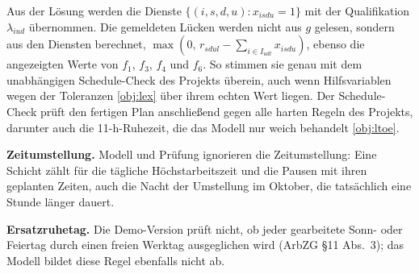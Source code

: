 \documentclass[11pt]{combiArticle}
\begin{document}
Aus der Lösung werden die Dienste $\{(i,s,d,u) : x_{isdu} = 1\}$ mit der Qualifikation $\lambda_{iud}$
übernommen. Die gemeldeten Lücken werden nicht aus $g$ gelesen, sondern aus den Diensten berechnet,
$\max(0,\, r_{sdul} - \sum_{i \in I_{udl}} x_{isdu})$, ebenso die angezeigten Werte von $f_1$, $f_3$, $f_4$ und
$f_6$. So stimmen sie genau mit dem unabhängigen Schedule-Check des Projekts überein, auch wenn Hilfsvariablen
wegen der Toleranzen \eqref{obj:lex} über ihrem echten Wert liegen. Der Schedule-Check prüft den fertigen Plan
anschließend gegen alle harten Regeln des Projekts, darunter auch die 11-h-Ruhezeit, die das Modell nur weich
behandelt \eqref{obj:ltoe}.

\textbf{Zeitumstellung.} Modell und Prüfung ignorieren die Zeitumstellung: Eine Schicht zählt für die tägliche
Höchstarbeitszeit und die Pausen mit ihren geplanten Zeiten, auch die Nacht der Umstellung im Oktober, die
tatsächlich eine Stunde länger dauert.

\textbf{Ersatzruhetag.} Die Demo-Version prüft nicht, ob jeder gearbeitete Sonn- oder Feiertag durch einen freien
Werktag ausgeglichen wird (ArbZG §11 Abs.~3); das Modell bildet diese Regel ebenfalls nicht ab.
\end{document}
